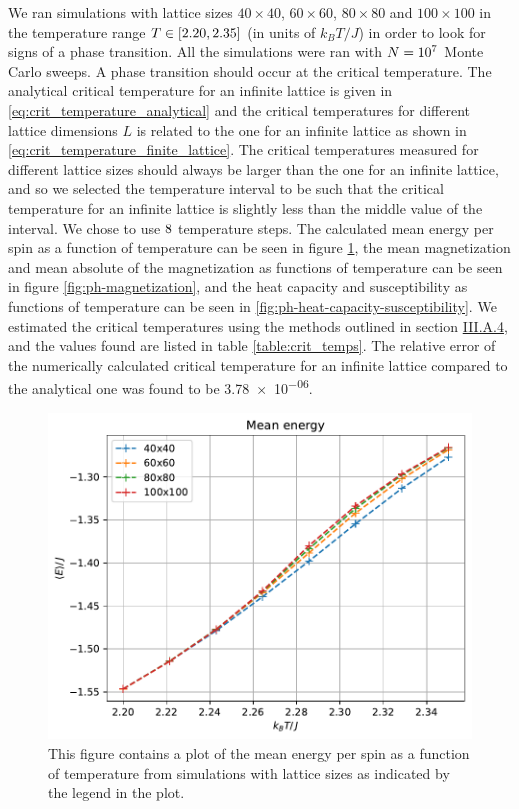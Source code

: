 \documentclass[reprint,english,notitlepage]{revtex4-1}  %
\begin{document}
We ran simulations with lattice sizes $40\times 40$, $60 \times 60$, $80 \times 80$ and $100 \times 100$ in the temperature range $T\in[2.20 ,2.35 ]$ (in units of $k_B T/J$) in order to look for signs of a phase transition. All the simulations were ran with $N=10^7$ Monte Carlo sweeps. A phase transition should occur at the critical temperature. The analytical critical temperature for an infinite lattice is given in \eqref{eq:crit_temperature_analytical} and the critical temperatures for different lattice dimensions $L$ is related to the one for an infinite lattice as shown in \eqref{eq:crit_temperature_finite_lattice}. The critical temperatures measured for different lattice sizes should always be larger than the one for an infinite lattice, and so we selected the temperature interval to be such that the critical temperature for an infinite lattice is slightly less than the middle value of the interval. We chose to use $8$ temperature steps. The calculated mean energy per spin as a function of temperature can be seen in figure \ref{fig:ph-energy}, the mean magnetization and mean absolute of the magnetization as functions of temperature can be seen in figure \ref{fig:ph-magnetization}, and the heat capacity and susceptibility as functions of temperature can be seen in \ref{fig:ph-heat-capacity-susceptibility}. We estimated the critical temperatures using the methods outlined in section \hyperref[sec:III:A.iv]{III.A.4}, and the values found are listed in table \ref{table:crit_temps}. The relative error of the numerically calculated critical temperature for an infinite lattice compared to the analytical one was found to be \num{3.78e-06}.


\begin{figure}[H]
\centering
\includegraphics[width=\columnwidth]{../data/phase-transition-E.pdf}
\caption{This figure contains a plot of the mean energy per spin as a function of temperature from simulations with lattice sizes as indicated by the legend in the plot.} \label{fig:ph-energy}
\end{figure}
\end{document}
